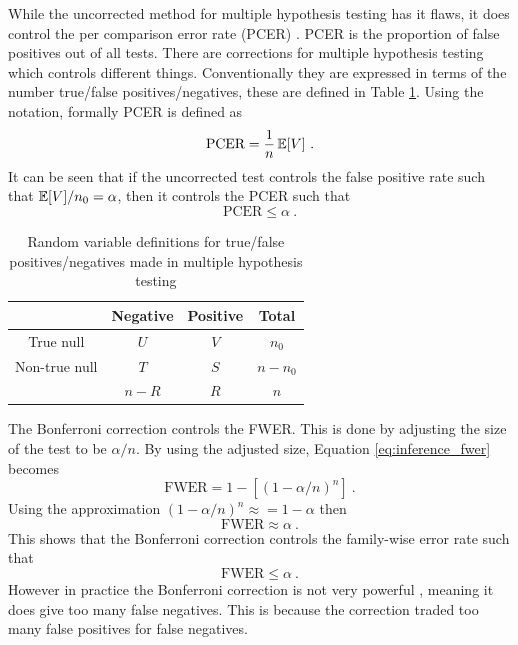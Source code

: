 While the uncorrected method for multiple hypothesis testing has it flaws, it does control the per comparison error rate (PCER) \citep{benjamini1995controlling}. PCER is the proportion of false positives out of all tests. There are corrections for multiple hypothesis testing which controls different things. Conventionally they are expressed in terms of the number true/false positives/negatives, these are defined in Table \ref{table:inference_randomvariables}. Using the notation, formally PCER is defined as
\begin{equation}
    \text{PCER}=
    \dfrac{
        1
    }
    {
        n
    }
    \operatorname{\mathbb{E}}[V]
    \ .
\end{equation}
It can be seen that if the uncorrected test controls the false positive rate such that $\operatorname{\mathbb{E}}[V]/n_0 = \alpha$, then it controls the PCER such that
\begin{equation}
    \text{PCER}\leqslant\alpha \ .
\end{equation}

\begin{table}
    \centering
    \begin{tabular}{c|c|c|c}
        &Negative&Positive&Total\\\hline
        True null & $U$ & $V$ & $n_0$\\
        Non-true null & $T$ & $S$ & $n-n_0$\\\hline
        &$n-R$&$R$&$n$
    \end{tabular}
    \caption{Random variable definitions for true/false positives/negatives made in multiple hypothesis testing}
    \label{table:inference_randomvariables}
\end{table}

The Bonferroni correction \citep{shaffer1995multiple, bland1995multiple, perneger1998what} controls the FWER. This is done by adjusting the size of the test to be $\alpha/n$. By using the adjusted size, Equation \eqref{eq:inference_fwer} becomes
\begin{equation}
    \text{FWER}=1-\left[(1-\alpha/n)^n\right]\ .
\end{equation}
Using the approximation $(1-\alpha/n)^n\approx = 1-\alpha$ then
\begin{equation}
    \text{FWER}\approx \alpha \ .
\end{equation}
This shows that the Bonferroni correction controls the family-wise error rate such that
\begin{equation}
    \text{FWER} \leqslant \alpha \ .
\end{equation}
However in practice the Bonferroni correction is not very powerful \citep{perneger1998what}, meaning it does give too many false negatives. This is because the correction traded too many false positives for false negatives.

